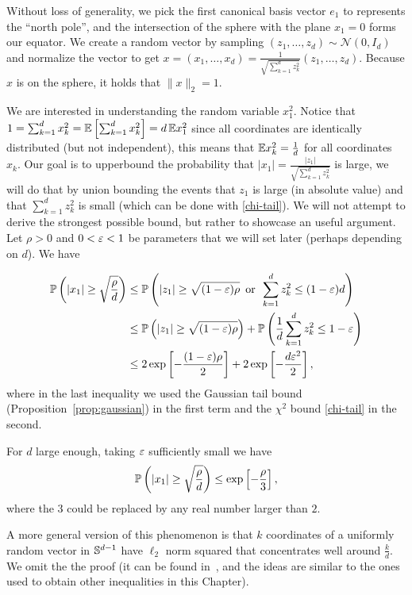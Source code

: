 Without loss of generality, we pick the first canonical basis vector $e_1$ to represents the  ``north pole'', and the intersection of the sphere with the plane $x_1=0$  forms our equator. %
We create a random vector  by sampling $(z_1,\dots,z_d) \sim {\mathcal N}(0,I_d)$ and normalize the vector to get $x = (x_1,\dots, x_d) = \frac{1}{\sqrt{\sum_{k=1}^d z_k^2}} (z_1,\dots,z_d)$. Because $x$ is on the sphere, it holds that $\|x\|_2=1$. %

We are interested in understanding the random variable $x_1^2$. Notice that $1=\sum_{k=1}^d x_k^2 = \E\left[\sum_{k=1}^d x_k^2\right] =d\,\E x_1^2$ since all coordinates are identically distributed (but not independent), this means that $\EE x_k^2=\frac1{d}$ for all coordinates $x_k$. Our goal is to upperbound the probability that $|x_1|=\frac{|z_1|}{\sqrt{\sum_{k=1}^d z_k^2}}$ is large, we will do that by union bounding the events that $z_1$ is large (in absolute value) and that $\sum_{k=1}^d z_k^2$ is small (which can be done with \eqref{chi-tail}). We will not attempt to derive the strongest possible bound, but rather to showcase an useful argument. Let $\rho>0$ and $0<\eps<1$ be parameters that we will set later (perhaps depending on $d$). We have

\begin{align*}
\P\left( |x_1|  \geq \sqrt{\frac{\rho}{d}} \right) & \leq \P\left( |z_1| \geq \sqrt{(1-\eps)\rho} \,\text{ or }\, \sum_{k=1}^d z_k^2 \leq (1-\eps)d \right) \\
& \leq \P\left( |z_1| \geq \sqrt{(1-\eps)\rho} \right) + \P\left( \frac1d\sum_{k=1}^d z_k^2 \leq 1 - \eps \right) \\
& \leq 2\exp\left[ -\frac{(1-\eps)\rho}{2} \right] + 2\exp\left[ -\frac{d\eps^2}2 \right],
\end{align*}
where in the last inequality we used the Gaussian tail bound (Proposition~\ref{prop:gaussian}) in the first term and the $\chi^2$ bound \eqref{chi-tail} in the second.

For $d$ large enough, taking $\eps$ sufficiently small we have $$\P\left( |x_1|  \geq \sqrt{\frac{\rho}{d}} \right) \leq \exp\left[ -\frac{\rho}{3} \right],$$ where the $3$ could be replaced by any real number larger than $2$.



A more general version of this phenomenon is that $k$ coordinates of a uniformly random vector in $\SSS^{d-1}$ have $\ell_2$ norm squared that concentrates well around $\frac{k}{d}$. We omit the the proof (it can be found in~\cite{Dasgupta_Gupta_JLsimpleproof}, and the ideas are similar to the ones used to obtain other inequalities in this Chapter).

